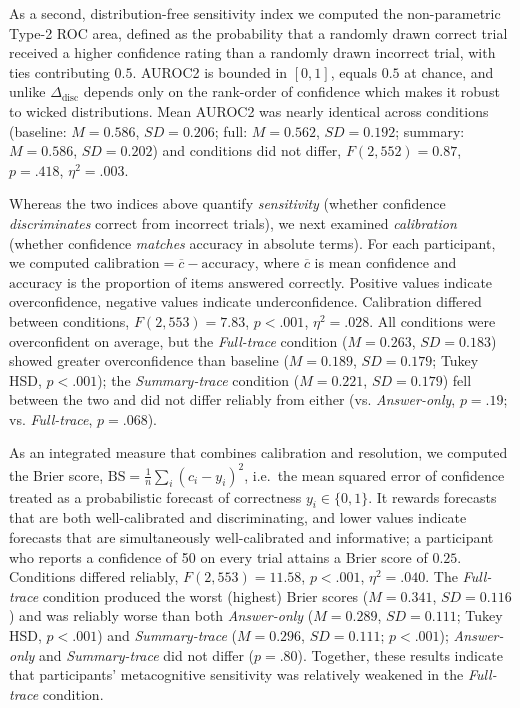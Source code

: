 \documentclass[manuscript,review,anonymous]{acmart}
\begin{document}
As a second, distribution-free sensitivity index we computed the non-parametric Type-2 ROC area, defined as the probability that a randomly drawn correct trial received a higher confidence rating than a randomly drawn incorrect trial, with ties contributing $0.5$. AUROC2 is bounded in $[0,1]$, equals $0.5$ at chance, and unlike
$\Delta_{\text{disc}}$ depends only on the rank-order of confidence which makes it robust to wicked distributions. Mean AUROC2 was nearly identical across conditions
(baseline: $M = 0.586$, $SD = 0.206$; full: $M = 0.562$, $SD = 0.192$;
summary: $M = 0.586$, $SD = 0.202$) and conditions did not differ, $F(2, 552) = 0.87$, $p = .418$, $\eta^2 = .003$.

Whereas the two indices above quantify \emph{sensitivity} (whether confidence \emph{discriminates} correct from incorrect trials), we
next examined \emph{calibration} (whether confidence \emph{matches} accuracy in absolute terms). For each participant, we computed
$\mathrm{calibration} = \overline{c} - \mathrm{accuracy}$, where $\overline{c}$ is mean confidence and $\mathrm{accuracy}$ is the proportion of items answered correctly. Positive values indicate overconfidence, negative values indicate underconfidence. Calibration differed between conditions, $F(2, 553) = 7.83$, $p < .001$, $\eta^2 = .028$.
All conditions were overconfident on average, but the \textit{Full-trace} condition ($M = 0.263$, $SD = 0.183$) showed greater overconfidence
than baseline ($M = 0.189$, $SD = 0.179$; Tukey HSD, $p < .001$); the \textit{Summary-trace} condition ($M = 0.221$, $SD = 0.179$) fell between the
two and did not differ reliably from either (vs. \textit{Answer-only}, $p = .19$; vs. \textit{Full-trace}, $p = .068$).


As an integrated measure that combines calibration and resolution, we computed the Brier score, $\mathrm{BS} = \tfrac{1}{n}\sum_{i}(c_i - y_i)^2$, i.e.\ the mean squared error of confidence treated as a probabilistic forecast of correctness $y_i \in \{0,1\}$. It rewards forecasts that are both well-calibrated and discriminating, and lower values indicate forecasts that are simultaneously well-calibrated and informative; a participant who reports a confidence of 50 on every trial attains a Brier score of $0.25$. Conditions differed reliably, $F(2, 553) = 11.58$, $p < .001$, $\eta^2 = .040$. The \textit{Full-trace} condition produced the worst (highest) Brier scores ($M = 0.341$, $SD = 0.116$) and was reliably worse than both \textit{Answer-only} ($M = 0.289$, $SD = 0.111$; Tukey HSD, $p < .001$) and \textit{Summary-trace} ($M = 0.296$, $SD = 0.111$; $p < .001$); \textit{Answer-only} and \textit{Summary-trace} did not differ ($p = .80$). Together, these results indicate that participants' metacognitive sensitivity was relatively weakened in the \textit{Full-trace} condition.
\end{document}
